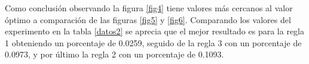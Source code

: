 \documentclass[12pt]{amsart}
\begin{document}
Como conclusión observando la figura \ref{fig4} tiene valores más cercanos al valor óptimo a comparación de las figuras \ref{fig5} y \ref{fig6}. Comparando los valores del experimento en la tabla \ref{datos2} se aprecia que el mejor resultado es para la regla 1 obteniendo un porcentaje de 0.0259, seguido de la regla 3 con un porcentaje de 0.0973, y por último la regla 2 con un porcentaje de 0.1093.

\clearpage


\end{document}
